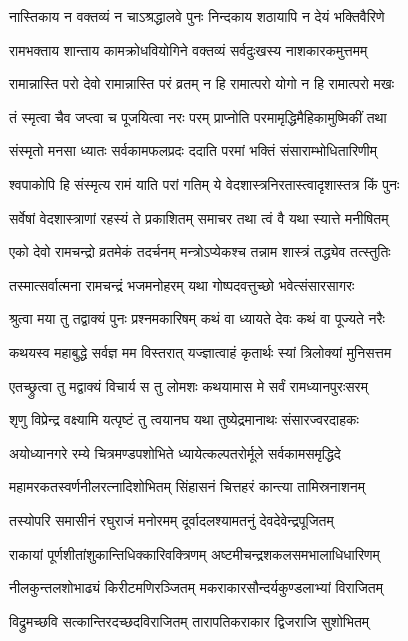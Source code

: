 \twolineshloka
{नास्तिकाय न वक्तव्यं न चाऽश्रद्धालवे पुनः}
{निन्दकाय शठायापि न देयं भक्तिवैरिणे}%

\twolineshloka
{रामभक्ताय शान्ताय कामक्रोधवियोगिने}
{वक्तव्यं सर्वदुःखस्य नाशकारकमुत्तमम्}%

\twolineshloka
{रामान्नास्ति परो देवो रामान्नास्ति परं व्रतम्}
{न हि रामात्परो योगो न हि रामात्परो मखः}%

\twolineshloka
{तं स्मृत्वा चैव जप्त्वा च पूजयित्वा नरः परम्}
{प्राप्नोति परमामृद्धिमैहिकामुष्मिकीं तथा}%

\twolineshloka
{संस्मृतो मनसा ध्यातः सर्वकामफलप्रदः}
{ददाति परमां भक्तिं संसाराम्भोधितारिणीम्}%

\twolineshloka
{श्वपाकोपि हि संस्मृत्य रामं याति परां गतिम्}
{ये वेदशास्त्रनिरतास्त्वादृशास्तत्र किं पुनः}%

\twolineshloka
{सर्वेषां वेदशास्त्राणां रहस्यं ते प्रकाशितम्}
{समाचर तथा त्वं वै यथा स्यात्ते मनीषितम्}%

\twolineshloka
{एको देवो रामचन्द्रो व्रतमेकं तदर्चनम्}
{मन्त्रोऽप्येकश्च तन्नाम शास्त्रं तद्ध्येव तत्स्तुतिः}%

\twolineshloka
{तस्मात्सर्वात्मना रामचन्द्रं भजमनोहरम्}
{यथा गोष्पदवत्तुच्छो भवेत्संसारसागरः}%

\twolineshloka
{श्रुत्वा मया तु तद्वाक्यं पुनः प्रश्नमकारिषम्}
{कथं वा ध्यायते देवः कथं वा पूज्यते नरैः}%

\twolineshloka
{कथयस्व महाबुद्धे सर्वज्ञ मम विस्तरात्}
{यज्ज्ञात्वाहं कृतार्थः स्यां त्रिलोक्यां मुनिसत्तम}%

\twolineshloka
{एतच्छ्रुत्वा तु मद्वाक्यं विचार्य स तु लोमशः}
{कथयामास मे सर्वं रामध्यानपुरःसरम्}%

\twolineshloka
{शृणु विप्रेन्द्र वक्ष्यामि यत्पृष्टं तु त्वयानघ}
{यथा तुष्येद्रमानाथः संसारज्वरदाहकः}%

\twolineshloka
{अयोध्यानगरे रम्ये चित्रमण्डपशोभिते}
{ध्यायेत्कल्पतरोर्मूले सर्वकामसमृद्धिदे}%

\twolineshloka
{महामरकतस्वर्णनीलरत्नादिशोभितम्}
{सिंहासनं चित्तहरं कान्त्या तामिस्रनाशनम्}%

\twolineshloka
{तस्योपरि समासीनं रघुराजं मनोरमम्}
{दूर्वादलश्यामतनुं देवदेवेन्द्रपूजितम्}%

\twolineshloka
{राकायां पूर्णशीतांशुकान्तिधिक्कारिवक्त्रिणम्}
{अष्टमीचन्द्रशकलसमभालाधिधारिणम्}%

\twolineshloka
{नीलकुन्तलशोभाढ्यं किरीटमणिरञ्जितम्}
{मकराकारसौन्दर्यकुण्डलाभ्यां विराजितम्}%

\twolineshloka
{विद्रुमच्छवि सत्कान्तिरदच्छदविराजितम्}
{तारापतिकराकार द्विजराजि सुशोभितम्}%

